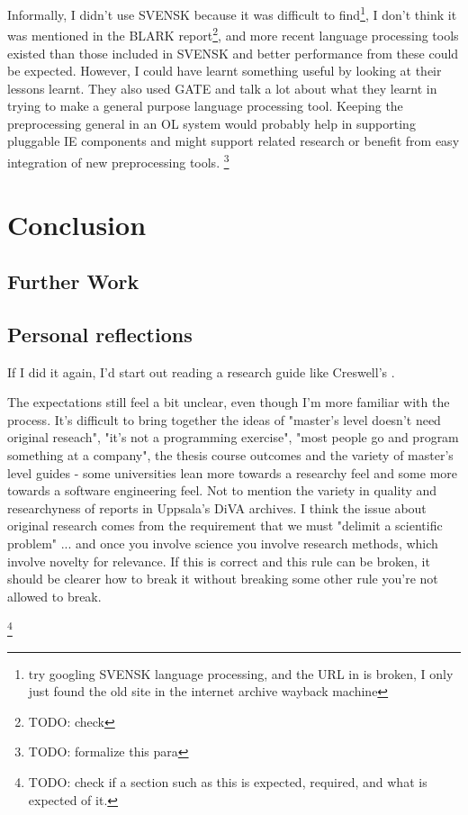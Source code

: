 \documentclass[a4paper]{report}
\newcommand{\todo}[1]{\footnote{{\color{red} TODO: #1}}}
\begin{document}
Informally, I didn't use SVENSK because it was difficult to find\footnote{try googling SVENSK language processing, and the URL in \cite{Olsson98SVENSKTagging} is broken, I only just found the old site in the internet archive wayback machine}, I don't think it was mentioned in the BLARK report\todo{check}, and more recent language processing tools existed than those included in SVENSK and better performance from these could be expected.
However, I could have learnt something useful by looking at their lessons learnt.
They also used GATE and talk a lot about what they learnt in trying to make a general purpose language processing tool.
Keeping the preprocessing general in an OL system would probably help in supporting pluggable IE components and might support related research or benefit from easy integration of new preprocessing tools. \todo{formalize this para}


\chapter{Conclusion}

\section{Further Work}

\section{Personal reflections}

If I did it again, I'd start out reading a research guide like Creswell's \cite{creswell2003research}.

The expectations still feel a bit unclear, even though I'm more familiar with the process. It's difficult to bring together the ideas of "master's level doesn't need original reseach", "it's not a programming exercise", "most people go and program something at a company", the thesis course outcomes and the variety of master's level guides - some universities lean more towards a researchy feel and some more towards a software engineering feel. Not to mention the variety in quality and researchyness of reports in Uppsala's DiVA archives. I think the issue about original research comes from the requirement that we must "delimit a scientific problem" ... and once you involve science you involve research methods, which involve novelty for relevance. If this is correct and this rule can be broken, it should be clearer how to break it without breaking some other rule you're not allowed to break.

\todo{check if a section such as this is expected, required, and what is expected of it.}

\clearpage



\end{document}

